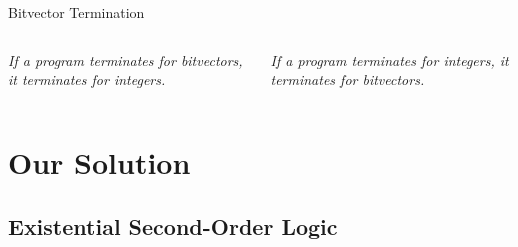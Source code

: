 \documentclass[xcolor=pdftex,t,11pt]{beamer}
\newcommand{\xmark}{\ding{55}}
\begin{document}
\begin{frame}[fragile]{Bitvector Termination}
 \begin{columns}[c]

  \emph{If a program terminates for bitvectors, it terminates for integers.}

  \uncover<2->{{\centering \color{red} \Huge \xmark
  
  }
  
  
  }
  
  \emph{If a program terminates for integers, it terminates for bitvectors.}

  \uncover<3->{{\centering \color{red} \Huge \xmark
  
  }
  
  
  }
  
 \end{columns}

 
 
 \vspace{1.5em}
 
 

 
\end{frame}

% 



\section{Our Solution}

\subsection{Existential Second-Order Logic}
\end{document}
